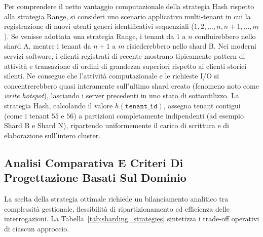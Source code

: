 \documentclass[11pt, a4paper]{article}
\begin{document}

Per comprendere il netto vantaggio computazionale della strategia Hash rispetto alla strategia Range, si consideri uno scenario applicativo multi-tenant in cui la registrazione di nuovi utenti generi identificativi sequenziali ($1, 2, \dots, n, n+1, \dots, m$). Se venisse adottata una strategia Range, i tenant da $1$ a $n$ confluirebbero nello shard A, mentre i tenant da $n+1$ a $m$ risiederebbero nello shard B. Nei moderni servizi software, i clienti registrati di recente mostrano tipicamente pattern di attività e transazione di ordini di grandezza superiori rispetto ai clienti storici silenti. Ne consegue che l'attività computazionale e le richieste I/O si concentrerebbero quasi interamente sull'ultimo shard creato (fenomeno noto come \emph{write hotspot}), lasciando i server precedenti in uno stato di sottoutilizzo. La strategia Hash, calcolando il valore $h(\texttt{tenant\_id})$, assegna tenant contigui (come i tenant $55$ e $56$) a partizioni completamente indipendenti (ad esempio Shard B e Shard N), ripartendo uniformemente il carico di scrittura e di elaborazione sull'intero cluster.

\subsection{Analisi Comparativa E Criteri Di Progettazione Basati Sul Dominio}

La scelta della strategia ottimale richiede un bilanciamento analitico tra complessità gestionale, flessibilità di ripartizionamento ed efficienza delle interrogazioni. La Tabella~\ref{tab:sharding_strategies} sintetizza i trade-off operativi di ciascun approccio.
\end{document}

